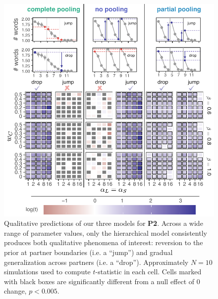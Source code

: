 \documentclass[10pt, man, floatsintext]{apa7}
\begin{document}
\begin{figure}
\includegraphics[scale=1.2]{./figures/param_grid_qualitative_cleaned.pdf}
\caption{Qualitative predictions of our three models for \textbf{P2}. Across a wide range of parameter values, only the hierarchical model consistently produces both qualitative phenomena of interest: reversion to the prior at partner boundaries (i.e. a ``jump'') and gradual generalization across partners (i.e. a ``drop''). Approximately $N=10$ simulations used to compute $t$-statistic in each cell. Cells marked with black boxes are significantly different from a null effect of 0 change, $p<0.005$.}
\label{fig:generalization_modelcomparison}
\end{figure}

%
\end{document}
